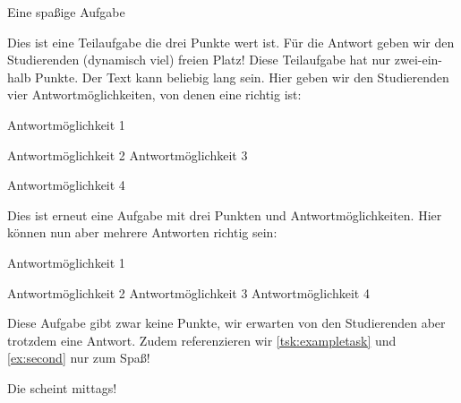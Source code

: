 \begin{Exercise}{Eine spaßige Aufgabe}
\begin{tasks}
    Dies ist eine Teilaufgabe die drei Punkte wert ist. Für die Antwort geben wir den Studierenden (dynamisch viel) freien Platz!
   \VerticalSpace
    \label{tsk:exampletask}Diese Teilaufgabe hat nur zwei-ein-halb Punkte. Der Text kann beliebig lang sein. Hier geben wir den Studierenden vier Antwortmöglichkeiten, von denen eine richtig ist:
   \begin{radioboxes}
      \item Antwortmöglichkeit 1
      \item Antwortmöglichkeit 2
      \correct Antwortmöglichkeit 3
      \item Antwortmöglichkeit 4
   \end{radioboxes}
    Dies ist erneut eine Aufgabe mit drei Punkten und Antwortmöglichkeiten. Hier können nun aber mehrere Antworten richtig sein:
   \begin{checkboxes}
      \correct Antwortmöglichkeit 1
      \item    Antwortmöglichkeit 2
      \correct Antwortmöglichkeit 3
      \correct Antwortmöglichkeit 4
   \end{checkboxes}
    Diese Aufgabe gibt zwar keine Punkte, wir erwarten von den Studierenden aber trotzdem eine Antwort. Zudem referenzieren wir \autoref{tsk:exampletask} und \autoref{ex:second} nur zum Spaß!

   Die  scheint mittags!
   \qquad\strut
\end{tasks}
\end{Exercise}